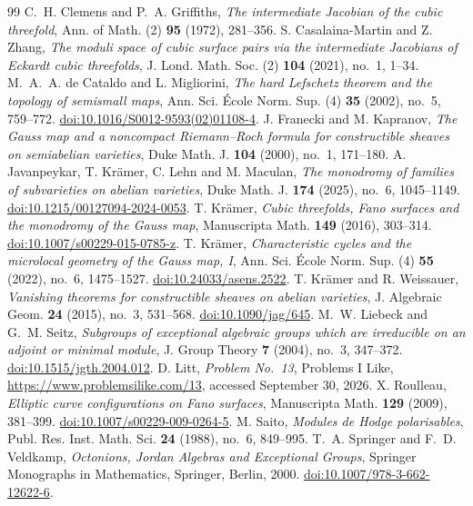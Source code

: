 \documentclass[10pt]{amsart}
\numberwithin{equation}{section}
\theoremstyle{remark}
\begin{document}
\begin{thebibliography}{99}
 C.~H. Clemens and P.~A. Griffiths,
\emph{The intermediate Jacobian of the cubic threefold},
Ann. of Math. (2) \textbf{95} (1972), 281--356.
 S. Casalaina-Martin and Z. Zhang,
\emph{The moduli space of cubic surface pairs via the intermediate
Jacobians of Eckardt cubic threefolds}, J. Lond. Math. Soc. (2)
\textbf{104} (2021), no.~1, 1--34.
 M.~A.~A. de Cataldo and L. Migliorini,
\emph{The hard Lefschetz theorem and the topology of semismall maps},
Ann. Sci. \'Ecole Norm. Sup. (4) \textbf{35} (2002), no.~5, 759--772.
\href{https://doi.org/10.1016/S0012-9593(02)01108-4}{doi:10.1016/S0012-9593(02)01108-4}.
 J. Franecki and M. Kapranov,
\emph{The Gauss map and a noncompact Riemann--Roch formula for
constructible sheaves on semiabelian varieties}, Duke Math. J.
\textbf{104} (2000), no.~1, 171--180.
 A. Javanpeykar, T. Kr\"amer, C. Lehn and M. Maculan,
\emph{The monodromy of families of subvarieties on abelian varieties},
Duke Math. J. \textbf{174} (2025), no.~6, 1045--1149.
\href{https://doi.org/10.1215/00127094-2024-0053}{doi:10.1215/00127094-2024-0053}.
 T. Kr\"amer,
\emph{Cubic threefolds, Fano surfaces and the monodromy of the Gauss map},
Manuscripta Math. \textbf{149} (2016), 303--314.
\href{https://doi.org/10.1007/s00229-015-0785-z}{doi:10.1007/s00229-015-0785-z}.
 T. Kr\"amer,
\emph{Characteristic cycles and the microlocal geometry of the Gauss map, I},
Ann. Sci. \'Ecole Norm. Sup. (4) \textbf{55} (2022), no.~6, 1475--1527.
\href{https://doi.org/10.24033/asens.2522}{doi:10.24033/asens.2522}.
 T. Kr\"amer and R. Weissauer,
\emph{Vanishing theorems for constructible sheaves on abelian varieties},
J. Algebraic Geom. \textbf{24} (2015), no.~3, 531--568.
\href{https://doi.org/10.1090/jag/645}{doi:10.1090/jag/645}.
 M.~W. Liebeck and G.~M. Seitz,
\emph{Subgroups of exceptional algebraic groups which are irreducible on
an adjoint or minimal module}, J. Group Theory \textbf{7} (2004), no.~3,
347--372.
\href{https://doi.org/10.1515/jgth.2004.012}{doi:10.1515/jgth.2004.012}.
 D. Litt, \emph{Problem No.~13}, Problems I Like,
\url{https://www.problemsilike.com/13}, accessed September 30, 2026.
 X. Roulleau,
\emph{Elliptic curve configurations on Fano surfaces},
Manuscripta Math. \textbf{129} (2009), 381--399.
\href{https://doi.org/10.1007/s00229-009-0264-5}{doi:10.1007/s00229-009-0264-5}.
 M. Saito, \emph{Modules de Hodge polarisables},
Publ. Res. Inst. Math. Sci. \textbf{24} (1988), no.~6, 849--995.
 T.~A. Springer and F.~D. Veldkamp,
\emph{Octonions, Jordan Algebras and Exceptional Groups},
Springer Monographs in Mathematics, Springer, Berlin, 2000.
\href{https://doi.org/10.1007/978-3-662-12622-6}{doi:10.1007/978-3-662-12622-6}.
\end{thebibliography}
\end{document}
